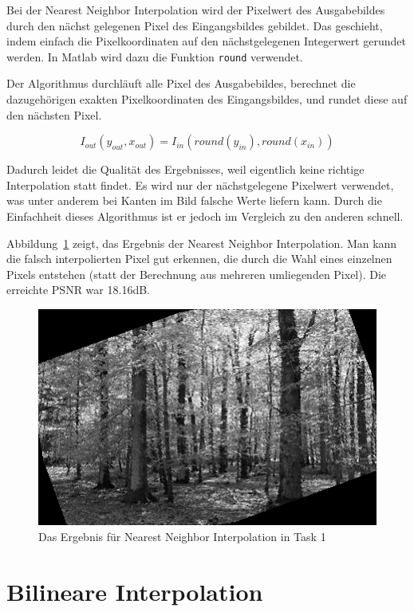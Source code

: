 Bei der Nearest Neighbor Interpolation wird der Pixelwert des Ausgabebildes durch den nächst gelegenen Pixel des Eingangsbildes gebildet. Das geschieht, indem einfach die Pixelkoordinaten auf den nächstgelegenen Integerwert gerundet werden. In Matlab wird dazu die Funktion \texttt{round} verwendet.

Der Algorithmus durchläuft alle Pixel des Ausgabebildes, berechnet die dazugehörigen exakten Pixelkoordinaten des Eingangsbildes, und rundet diese auf den nächsten Pixel.

\begin{equation}
 I_{out}(y_{out}, x_{out}) = I_{in}(round(y_{in}), round(x_{in}))
\end{equation}

Dadurch leidet die Qualität des Ergebnisses, weil eigentlich keine richtige Interpolation statt findet. Es wird nur der nächstgelegene Pixelwert verwendet, was unter anderem bei Kanten im Bild falsche Werte liefern kann. Durch die Einfachheit dieses Algorithmus ist er jedoch im Vergleich zu den anderen schnell.


\smallskip

Abbildung~\ref{fig:t1_nn} zeigt, das Ergebnis der Nearest Neighbor Interpolation. Man kann die falsch interpolierten Pixel gut erkennen, die durch die Wahl eines einzelnen Pixels entstehen (statt der Berechnung aus mehreren umliegenden Pixel). Die erreichte PSNR war 18.16dB.

\begin{figure}[htb]
 \centering
 \includegraphics{./img/t1_nn.png}
 \caption{Das Ergebnis für Nearest Neighbor Interpolation in Task 1}
 \label{fig:t1_nn}
\end{figure}

\clearpage



\section{Bilineare Interpolation}
\label{t1_bl}

